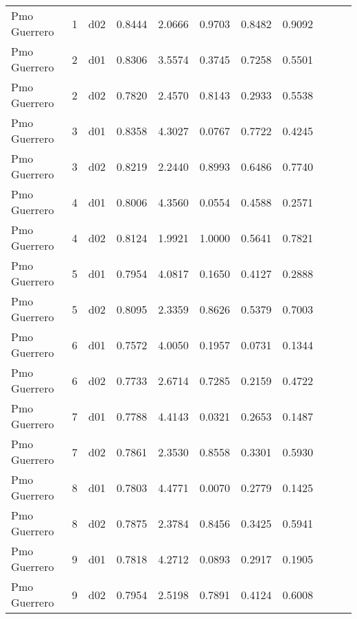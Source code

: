\begin{landscape}
\begin{longtable}{p{2cm}rrrrrrrrrr}
            Pmo Guerrero  &          1 &     d02 &   0.8444 &  2.0666 &        0.9703 &           0.8482 &  0.9092 \\
            Pmo Guerrero  &          2 &     d01 &   0.8306 &  3.5574 &        0.3745 &           0.7258 &  0.5501 \\
            Pmo Guerrero  &          2 &     d02 &   0.7820 &  2.4570 &        0.8143 &           0.2933 &  0.5538 \\
            Pmo Guerrero  &          3 &     d01 &   0.8358 &  4.3027 &        0.0767 &           0.7722 &  0.4245 \\
            Pmo Guerrero  &          3 &     d02 &   0.8219 &  2.2440 &        0.8993 &           0.6486 &  0.7740 \\
            Pmo Guerrero  &          4 &     d01 &   0.8006 &  4.3560 &        0.0554 &           0.4588 &  0.2571 \\
            Pmo Guerrero  &          4 &     d02 &   0.8124 &  1.9921 &        1.0000 &           0.5641 &  0.7821 \\
            Pmo Guerrero  &          5 &     d01 &   0.7954 &  4.0817 &        0.1650 &           0.4127 &  0.2888 \\
            Pmo Guerrero  &          5 &     d02 &   0.8095 &  2.3359 &        0.8626 &           0.5379 &  0.7003 \\
            Pmo Guerrero  &          6 &     d01 &   0.7572 &  4.0050 &        0.1957 &           0.0731 &  0.1344 \\
            Pmo Guerrero  &          6 &     d02 &   0.7733 &  2.6714 &        0.7285 &           0.2159 &  0.4722 \\
            Pmo Guerrero  &          7 &     d01 &   0.7788 &  4.4143 &        0.0321 &           0.2653 &  0.1487 \\
            Pmo Guerrero  &          7 &     d02 &   0.7861 &  2.3530 &        0.8558 &           0.3301 &  0.5930 \\
            Pmo Guerrero  &          8 &     d01 &   0.7803 &  4.4771 &        0.0070 &           0.2779 &  0.1425 \\
            Pmo Guerrero  &          8 &     d02 &   0.7875 &  2.3784 &        0.8456 &           0.3425 &  0.5941 \\
            Pmo Guerrero  &          9 &     d01 &   0.7818 &  4.2712 &        0.0893 &           0.2917 &  0.1905 \\
            Pmo Guerrero  &          9 &     d02 &   0.7954 &  2.5198 &        0.7891 &           0.4124 &  0.6008 \\

\end{longtable}
\end{landscape}
